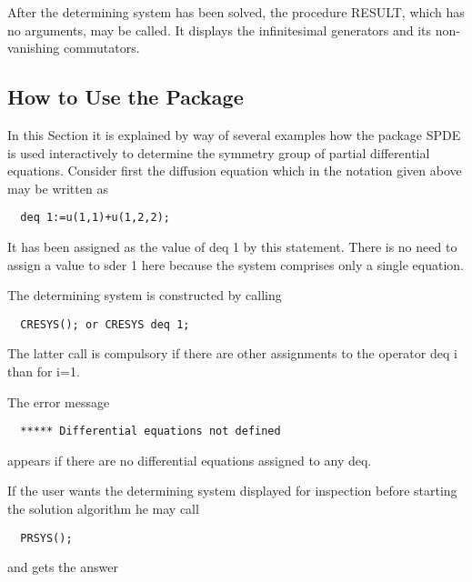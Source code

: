 After the determining system has been solved, the procedure RESULT,
which has no arguments, may be called. It displays the infinitesimal
generators and its non-vanishing commutators.


\subsection{How to Use the Package}

In this Section it is explained by way of several examples how the
package SPDE is used interactively to determine the symmetry group of
partial differential equations. Consider first the diffusion equation
which in the notation given above may be written as

\begin{verbatim}
  deq 1:=u(1,1)+u(1,2,2);
\end{verbatim}

It has been assigned as the value of deq 1 by this statement.  There
is no need to assign a value to sder 1 here because the system
comprises only a single equation.

The determining system is constructed by calling

\begin{verbatim}
  CRESYS(); or CRESYS deq 1;
\end{verbatim}

The latter call is compulsory if there are other assignments to the
operator deq i than for i=1.

The error message

\begin{verbatim}
  ***** Differential equations not defined
\end{verbatim}

appears if there are no differential equations assigned to any deq.

If the user wants the determining system displayed for inspection
before starting the solution algorithm he may call

\begin{verbatim}
  PRSYS();
\end{verbatim}

and gets the answer

